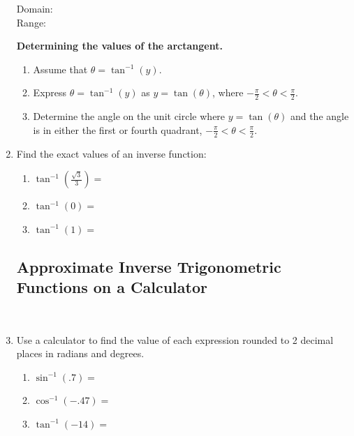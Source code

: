 \begin{enumerate}
{{     }
 }

\noindent Domain:\\[10pt]
\noindent Range:\\

\clearpage


   \noindent\colorbox{blue!10}{%
   \parbox{\dimexpr\linewidth}%
   {%
     \textbf{Determining the values of the arctangent.}

     \begin{enumerate}
     \item Assume that $\theta = \tan^{-1}(y)$.
     \item Express $\theta = \tan^{-1}(y)$ as $y=\tan(\theta)$, where
       $-\frac{\pi}{2} < \theta < \frac{\pi}{2}$.
     \item Determine the angle on the unit circle where
       $y=\tan(\theta)$ and the angle is in either the first or fourth
       quadrant, $-\frac{\pi}{2} < \theta < \frac{\pi}{2}$.
     \end{enumerate}

   }
 }




\vspace{-.1in}
\item Find the exact values of an inverse function:
 \begin{enumerate}
\item $\displaystyle \tan^{-1}\left(\frac{\sqrt{3}}{3}\right)=$\\[.5in]

\item $\displaystyle \tan^{-1}(0)=$\\[.5in]

\item $\displaystyle \tan^{-1}(1)=$\\[.5in]

\end{enumerate}


\subsection{Approximate Inverse Trigonometric Functions on a Calculator} ~

\item Use a calculator to find the value of each expression rounded to 2 decimal places in radians and degrees.
\begin{enumerate}
\item $\sin^{-1}(.7)=$\\
\item $\cos^{-1}(-.47)=$\\
\item $\tan^{-1}(-14)=$\\
\end{enumerate}



\end{enumerate}
